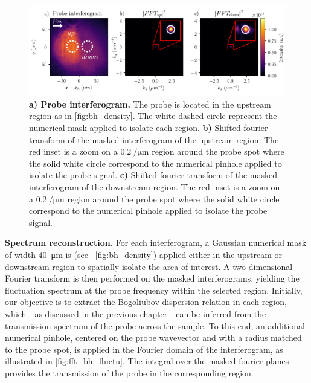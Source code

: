 \begin{figure}
    \centering
    \includegraphics[width=1\textwidth]{chap_stimulated_hawking/fig/fft_bh_fluctu.pdf}
    \caption{\textbf{a) Probe interferogram.} The probe is located in the upstream region as in \autoref{fig:bh_density}. The white dashed circle represent the numerical mask applied to isolate each region.
    \textbf{b)} Shifted fourier transform of the masked interferogram of the upstream region. The red inset is a zoom on a $\SI{0.2}{\per \micro \meter}$ region around the probe spot where the solid white circle correspond to the numerical pinhole applied to isolate the probe signal.
    \textbf{c)} Shifted fourier transform of the masked interferogram of the downstream region. The red inset is a zoom on a $\SI{0.2}{\per \micro \meter}$ region around the probe spot where the solid white circle correspond to the numerical pinhole applied to isolate the probe signal.}
    \label{fig:fft_bh_fluctu}
\end{figure}

\textbf{Spectrum reconstruction.} For each interferogram, a Gaussian numerical mask of width \SI{40}{\micro \meter} is (see ~\ref{fig:bh_density}) applied either in the upstream or downstream region to spatially isolate the area of interest. A two-dimensional Fourier transform is then performed on the masked interferograms, yielding the fluctuation spectrum at the probe frequency within the selected region.
Initially, our objective is to extract the Bogoliubov dispersion relation in each region, which—as discussed in the previous chapter—can be inferred from the transmission spectrum of the probe across the sample. To this end, an additional numerical pinhole, centered on the probe wavevector and with a radius matched to the probe spot, is applied in the Fourier domain of the interferogram, as illustrated in \autoref{fig:fft_bh_fluctu}.
The integral over the masked fourier planes provides the transmission of the probe in the corresponding region.


